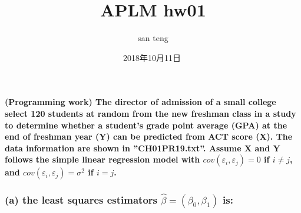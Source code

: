 \documentclass[]{article}
\title{APLM hw01}
\author{san teng}
\date{2018年10月11日}
\newenvironment{Shaded}{\begin{snugshade}}{\end{snugshade}}
\newcommand{\KeywordTok}[1]{\textcolor[rgb]{0.13,0.29,0.53}{\textbf{#1}}}
\newcommand{\StringTok}[1]{\textcolor[rgb]{0.31,0.60,0.02}{#1}}
\newcommand{\OperatorTok}[1]{\textcolor[rgb]{0.81,0.36,0.00}{\textbf{#1}}}
\newcommand{\NormalTok}[1]{#1}
\let\oldparagraph\paragraph
\renewcommand{\paragraph}[1]{\oldparagraph{#1}\mbox{}}
\begin{document}
\maketitle

\paragraph{\texorpdfstring{(Programming work) The director of admission
of a small college select 120 students at random from the new freshman
class in a study to determine whether a student's grade point average
(GPA) at the end of freshman year (Y) can be predicted from ACT score
(X). The data information are shown in ''CH01PR19.txt''. Assume X and Y
follows the simple linear regression model with
\(cov(\varepsilon_i , \varepsilon_j ) = 0\) if \(i \neq j\), and
\(cov(\varepsilon_i , \varepsilon_j ) = \sigma^2\) if
\(i = j\).}{(Programming work) The director of admission of a small college select 120 students at random from the new freshman class in a study to determine whether a student's grade point average (GPA) at the end of freshman year (Y) can be predicted from ACT score (X). The data information are shown in ''CH01PR19.txt''. Assume X and Y follows the simple linear regression model with cov(\textbackslash{}varepsilon\_i , \textbackslash{}varepsilon\_j ) = 0 if i \textbackslash{}neq j, and cov(\textbackslash{}varepsilon\_i , \textbackslash{}varepsilon\_j ) = \textbackslash{}sigma\^{}2 if i = j.}}\label{programming-work-the-director-of-admission-of-a-small-college-select-120-students-at-random-from-the-new-freshman-class-in-a-study-to-determine-whether-a-students-grade-point-average-gpa-at-the-end-of-freshman-year-y-can-be-predicted-from-act-score-x.-the-data-information-are-shown-in-ch01pr19.txt.-assume-x-and-y-follows-the-simple-linear-regression-model-with-covvarepsilon_i-varepsilon_j-0-if-i-neq-j-and-covvarepsilon_i-varepsilon_j-sigma2-if-i-j.}

\subsubsection{\texorpdfstring{(a) the least squares estimators
\(\hat{\beta} = (\beta_0 , \beta_1)\)
is:}{(a) the least squares estimators \textbackslash{}hat\{\textbackslash{}beta\} = (\textbackslash{}beta\_0 , \textbackslash{}beta\_1) is:}}\label{a-the-least-squares-estimators-hatbeta-beta_0-beta_1-is}

\begin{Shaded}
\end{Shaded}
\end{document}
